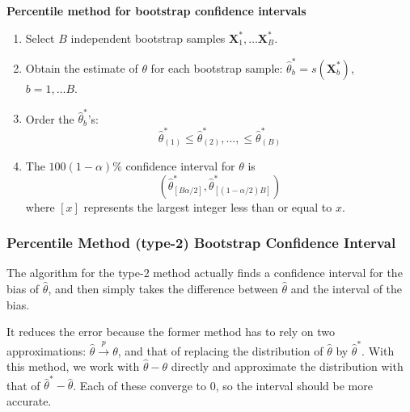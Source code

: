 \documentclass[12pt]{article}
\numberwithin{equation}{section}
\begin{document}
\textbf{Percentile method for bootstrap confidence intervals}
\begin{enumerate}
  \item Select $B$ independent bootstrap samples
  $\bm{X}_1^*, \ldots \bm{X}_B^*$.
  \item Obtain the estimate of $\theta$ for each bootstrap sample: $\hat{\theta}_b^* = s(\bm{X}_b^*)$, \ \ $b = 1, \ldots B$.
  \item Order the $\hat{\theta}_b^*$'s:
  \begin{equation*}
    \hat{\theta}_{(1)}^* \le \hat{\theta}_{(2)}^*, \ldots, \le \hat{\theta}_{(B)}^*
  \end{equation*}
  \item The $100(1 - \alpha)\%$ confidence interval for $\theta$ is
  \begin{equation*}
    \left(
    \hat{\theta}^*_{[B \alpha / 2]},
    \hat{\theta}^*_{[(1 - \alpha / 2) B]}
    \right)
  \end{equation*}
  where $[x]$ represents the largest integer less than or equal to $x$.
\end{enumerate}



\subsubsection{Percentile Method (type-2) Bootstrap Confidence Interval}
The algorithm for the type-2 method actually finds a confidence interval for the bias of $\hat{\theta}$, and then simply takes the difference between $\hat{\theta}$ and the interval of the bias. 

It reduces the error because the former method has to rely on two approximations: $\hat{\theta} \overset{p}{\to} \theta$, and that of replacing the distribution of $\hat{\theta}$ by $\hat{\theta}^*$. With this method, we work with $\hat{\theta} - \theta$ directly and approximate the distribution with that of $\hat{\theta}^* - \hat{\theta}$. Each of these converge to 0, so the interval should be more accurate.
\end{document}
